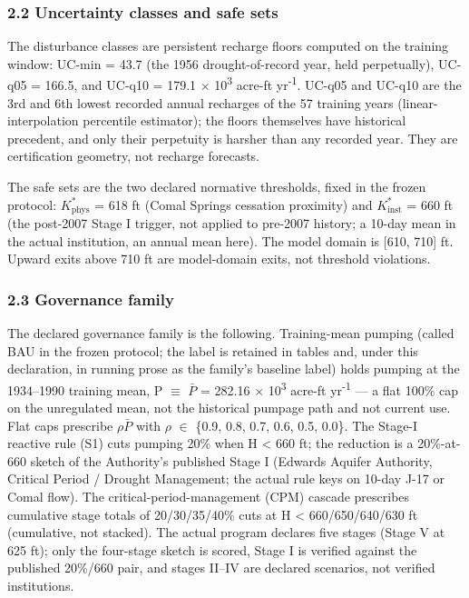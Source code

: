 \documentclass[11pt]{article}
\begin{document}
\subsubsection{2.2 Uncertainty classes and safe
sets}\label{uncertainty-classes-and-safe-sets}

The disturbance classes are persistent recharge floors computed on the
training window: UC-min = 43.7 (the 1956 drought-of-record year, held
perpetually), UC-q05 = 166.5, and UC-q10 = 179.1 \ensuremath{\times} 10\textsuperscript{3} acre-ft yr\textsuperscript{-1}.
UC-q05 and UC-q10 are the 3rd and 6th lowest recorded annual recharges
of the 57 training years (linear-interpolation percentile estimator);
the floors themselves have historical precedent, and only their
perpetuity is harsher than any recorded year. They are certification
geometry, not recharge forecasts.

The safe sets are the two declared normative thresholds, fixed in the
frozen protocol: \(K^{\ast}_{\mathrm{phys}}\) = 618 ft (Comal Springs
cessation proximity) and \(K^{\ast}_{\mathrm{inst}}\) = 660 ft (the
post-2007 Stage I trigger, not applied to pre-2007 history; a 10-day
mean in the actual institution, an annual mean here). The model domain
is {[}610, 710{]} ft. Upward exits above 710 ft are model-domain exits,
not threshold violations.

\subsubsection{2.3 Governance family}\label{governance-family}

The declared governance family is the following. Training-mean pumping
(called BAU in the frozen protocol; the label is retained in tables and,
under this declaration, in running prose as the family's baseline label)
holds pumping at the 1934--1990 training mean, P \ensuremath{\equiv} \(\bar{P}\) = 282.16 \ensuremath{\times} 10\textsuperscript{3}
acre-ft yr\textsuperscript{-1} --- a flat 100\% cap on the unregulated mean, not the
historical pumpage path and not current use. Flat caps prescribe \ensuremath{\rho}\(\bar{P}\) with
\ensuremath{\rho} \ensuremath{\in} \{0.9, 0.8, 0.7, 0.6, 0.5, 0.0\}. The Stage-I reactive rule (S1)
cuts pumping 20\% when H \textless{} 660 ft; the reduction is a
20\%-at-660 sketch of the Authority's published Stage I (Edwards Aquifer
Authority, Critical Period / Drought Management; the actual rule keys on
10-day J-17 or Comal flow). The critical-period-management (CPM) cascade
prescribes cumulative stage totals of 20/30/35/40\% cuts at H
\textless{} 660/650/640/630 ft (cumulative, not stacked). The actual
program declares five stages (Stage V at 625 ft); only the four-stage
sketch is scored, Stage I is verified against the published 20\%/660
pair, and stages II--IV are declared scenarios, not verified
institutions.
\end{document}
